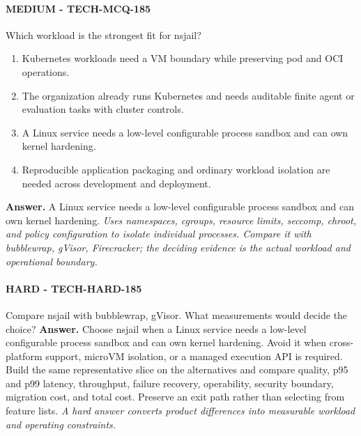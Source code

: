 \paragraph{MEDIUM - TECH-MCQ-185} Which workload is the strongest fit for nsjail?
\begin{enumerate}[label=\Alph*.]
\item Kubernetes workloads need a VM boundary while preserving pod and OCI operations.
\item The organization already runs Kubernetes and needs auditable finite agent or evaluation tasks with cluster controls.
\item A Linux service needs a low-level configurable process sandbox and can own kernel hardening.
\item Reproducible application packaging and ordinary workload isolation are needed across development and deployment.
\end{enumerate}
\textbf{Answer.} A Linux service needs a low-level configurable process sandbox and can own kernel hardening.
\textit{Uses namespaces, cgroups, resource limits, seccomp, chroot, and policy configuration to isolate individual processes. Compare it with bubblewrap, gVisor, Firecracker; the deciding evidence is the actual workload and operational boundary.}
\paragraph{HARD - TECH-HARD-185} Compare nsjail with bubblewrap, gVisor. What measurements would decide the choice?
\textbf{Answer.} Choose nsjail when a Linux service needs a low-level configurable process sandbox and can own kernel hardening. Avoid it when cross-platform support, microVM isolation, or a managed execution API is required. Build the same representative slice on the alternatives and compare quality, p95 and p99 latency, throughput, failure recovery, operability, security boundary, migration cost, and total cost. Preserve an exit path rather than selecting from feature lists.
\textit{A hard answer converts product differences into measurable workload and operating constraints.}
